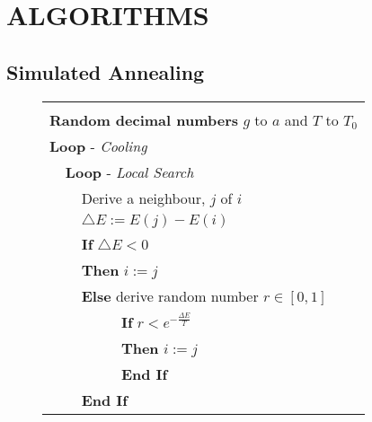 \chapter{ALGORITHMS}

\section*{\thesection \quad Simulated Annealing}

\begin{figure}[h!]
\begin{center}
\begin{footnotesize}
\begin{tabular}{|llll|}\hline%
    &     &     & \\%
\multicolumn{4}{|l|}{\textbf{Random decimal numbers} $g$ to $a$ and $T$ to $T_{0}$} \\%
\multicolumn{4}{|l|}{\textbf{Loop} - {\slshape Cooling}} \\%
    & \multicolumn{3}{l|}{\hspace{0.3cm} \textbf{Loop} - {\slshape Local Search}} \\%
    &     & \multicolumn{2}{l|}{\hspace{0.7cm} Derive a neighbour, $j$ of $i$} \\%
    &     & \multicolumn{2}{l|}{\hspace{0.7cm}$\triangle E:=E(j)-E(i)$ } \\%
    &     & \multicolumn{2}{l|}{\hspace{0.7cm} \textbf{If} $\triangle E < 0$} \\%
    &     & \multicolumn{2}{l|}{\hspace{0.7cm} \textbf{Then} $i:=j$} \\%
    &     & \multicolumn{2}{l|}{\hspace{0.7cm} \textbf{Else} derive random number $r \in [0,1]$} \\%
    &     &     &  \hspace{1.2cm} \textbf{If} $r < e^{ - \frac{{\Delta E}}{T}}$\\%
    &     &     &  \hspace{1.2cm} \textbf{Then} $i:=j$\\%
    &     &     &  \hspace{1.2cm} \textbf{End If} \\%
    &     & \multicolumn{2}{l|}{\hspace{0.7cm} \textbf{End If}} \\%

\end{tabular}
\end{footnotesize}
\end{center}
\end{figure}
